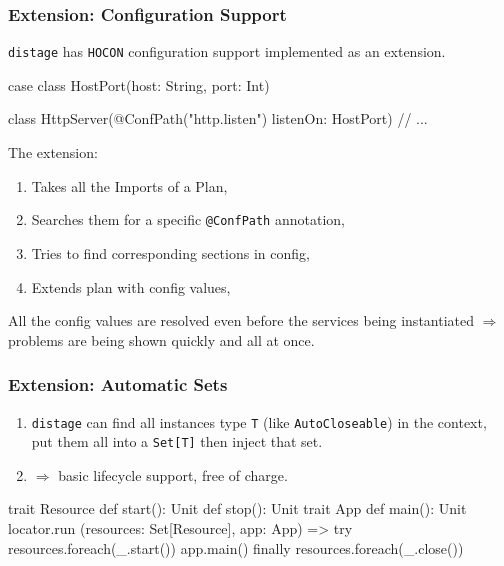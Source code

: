 \documentclass[usenames,dvipsnames]{beamer}
\newcommand{\distage}{\texttt{distage}\xspace}
\begin{document}
\begin{frame}[fragile]
\frametitle{Extension: Configuration Support}

\distage has \texttt{HOCON} configuration support implemented as an extension.

\begin{scalacode}
case class HostPort(host: String, port: Int)

class HttpServer(@ConfPath("http.listen") listenOn: HostPort) {
  // ...
}
\end{scalacode}

The extension:
\begin{enumerate}
\item Takes all the Imports of a Plan,
\item Searches them for a specific \texttt{@ConfPath} annotation,
\item Tries to find corresponding sections in config,
\item Extends plan with config values,
\end{enumerate}
All the config values are resolved even before the services being instantiated $\Rightarrow$ problems are being shown quickly and all at once.
\end{frame}

\begin{frame}[fragile]
\frametitle{Extension: Automatic Sets}

\begin{enumerate}
\item \distage can find all instances type \texttt{T} (like \texttt{AutoCloseable}) in the context,
put them all into a \texttt{Set[T]} then inject that set.
\item $\Rightarrow$ basic lifecycle support, free of charge.
\end{enumerate}

\begin{scalacode}
trait Resource {
  def start(): Unit
  def stop(): Unit
}
trait App { def main(): Unit }
locator.run { (resources: Set[Resource], app: App) =>
  try {
    resources.foreach(_.start())
    app.main()
  } finally {
    resources.foreach(_.close())
  }
}
\end{scalacode}
\end{frame}
\end{document}
